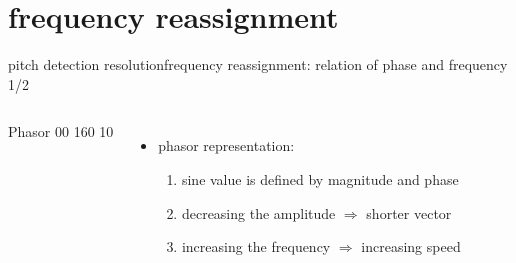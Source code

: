     \section{frequency reassignment}
        \begin{frame}{pitch detection resolution}{frequency reassignment: relation of phase and frequency 1/2}
            \begin{columns}
            \vspace{-10mm}
                {Phasor}
                {00}
                {160}
                {10}
           \begin{itemize}
                \item   phasor representation:
                    \begin{enumerate}
                        \item   sine value is defined by magnitude and phase
                        \item   decreasing the amplitude $\Rightarrow$ shorter vector
                        \item   increasing the frequency $\Rightarrow$ increasing speed
                    \end{enumerate}
            \end{itemize}
            \end{columns}

        \end{frame}
